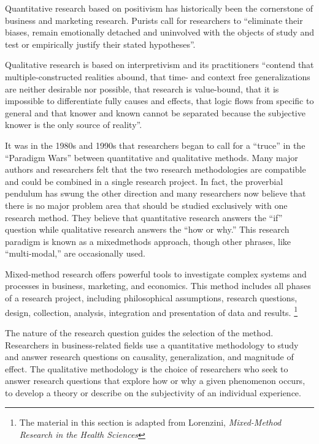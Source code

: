 Quantitative research based on \gls{positivism} has historically been the cornerstone of business and marketing research. Purists call for researchers to ``eliminate their biases, remain emotionally detached and uninvolved with the objects of study and test or empirically justify their stated hypotheses''\cite{johnson2004mixed}.

Qualitative research is based on \gls{interpretivism} and its practitioners ``contend that multiple-constructed realities abound, that time- and context free generalizations are neither desirable nor possible, that research is value-bound, that it is impossible to differentiate fully causes and effects, that logic flows from specific to general and that knower and known cannot be separated because the subjective knower is the only source of reality''\cite{johnson2004mixed}.

It was in the 1980s and 1990s that researchers began to call for a ``truce'' in the ``Paradigm Wars'' between quantitative and qualitative methods. Many major authors and researchers felt that the two research methodologies are compatible and could be combined in a single research project. In fact, the proverbial pendulum has swung the other direction and many researchers now believe that there is no major problem area that should be studied exclusively with one research method. They believe that quantitative research answers the ``if'' question while qualitative research answers the ``how or why.'' This research paradigm is known as a \gls{mixedmethods} approach, though other phrases, like ``multi-modal,'' are occasionally used.

Mixed-method research offers powerful tools to investigate complex systems and processes in business, marketing, and economics. This method includes all phases of a research project, including philosophical assumptions, research questions, design, collection, analysis, integration and presentation of data and results. \footnote{The material in this section is adapted from Lorenzini, \textit{Mixed-Method Research in the Health Sciences}\cite{lorenzini2017mixed}}

The nature of the research question guides the selection of the method. Researchers in business-related fields use a quantitative methodology to study and answer research questions on causality, generalization, and magnitude of effect. The qualitative methodology is the choice of researchers who seek to answer research questions that explore how or why a given phenomenon occurs, to develop a theory or describe on the subjectivity of an individual experience.

